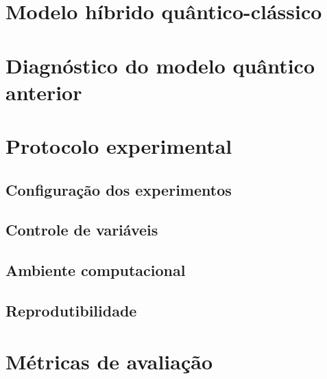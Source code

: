 \documentclass[
    12pt,
    openright,
    oneside,
    a4paper,
    english,
    brazil
]{abntex2}
\begin{document}

\section{Modelo híbrido quântico-clássico}


\section{Diagnóstico do modelo quântico anterior}


\section{Protocolo experimental}


\subsection{Configuração dos experimentos}
\subsection{Controle de variáveis}
\subsection{Ambiente computacional}
\subsection{Reprodutibilidade}

\section{Métricas de avaliação}
\end{document}
